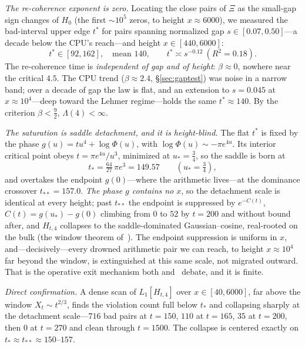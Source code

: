 \documentclass[11pt,reqno]{amsart}
\theoremstyle{plain}
\theoremstyle{definition}
\theoremstyle{remark}
\begin{document}
\emph{The re-coherence exponent is zero.} Locating the close pairs of
$\Xi$ as the small-gap sign changes of $H_0$ (the first $\sim\!10^5$ zeros,
to height $x\approx6000$), we measured the bad-interval upper edge
$t^\ast$ for pairs spanning normalized gap $s\in[0.07,0.50]$---a decade
below the CPU's reach---and height $x\in[440,6000]$:
\[
   t^\ast\in[92,162],\quad \text{mean }140,\qquad t^\ast\asymp
   s^{-0.12}\ (R^2=0.18).
\]
The re-coherence time is \emph{independent of gap and of height}:
$\beta\approx0$, nowhere near the critical $4.5$. The CPU trend
($\beta\approx2.4$, \S\ref{sec:gaptest}) was noise in a narrow band; over a
decade of gap the law is flat, and an extension to $s=0.045$ at $x\approx
10^4$---deep toward the Lehmer regime---holds the same $t^\ast\approx140$.
By the criterion $\beta<\tfrac92$, $\Lambda(4)<\infty$.

\emph{The saturation is saddle detachment, and it is height-blind.} The
flat $t^\ast$ is fixed by the phase $g(u)=tu^4+\log\Phi(u)$, with
$\log\Phi(u)\sim-\pi e^{4u}$. Its interior critical point obeys
$t=\pi e^{4u}/u^3$, minimized at $u_*=\tfrac34$, so the saddle is born at
\begin{equation}\label{eq:tstar4}
   t_*=\tfrac{64}{27}\,\pi e^{3}=149.57\qquad(u_*=\tfrac34),
\end{equation}
and overtakes the endpoint $g(0)$---where the arithmetic lives---at the
dominance crossover $t_{**}=157.0$. \emph{The phase $g$ contains no $x$},
so the detachment scale is identical at every height; past $t_{**}$ the
endpoint is suppressed by $e^{-C(t)}$, $C(t)=g(u_*)-g(0)$ climbing from $0$
to $52$ by $t=200$ and without bound after, and $H_{t,4}$ collapses to the
saddle-dominated Gaussian--cosine, real-rooted on the bulk (the window
theorem of~\cite{FontesIBM}). The endpoint suppression is uniform in $x$,
and---decisively---every drowned arithmetic pair we can reach, to height
$x\approx10^4$ far beyond the window, is extinguished at this same scale,
not migrated outward. That is the operative exit mechanism both
\cite{FontesIBM} and~\cite{FontesRMT} debate, and it is finite.

\emph{Direct confirmation.} A dense scan of $L_1[H_{t,4}]$ over
$x\in[40,6000]$, far above the window $X_t\sim t^{2/3}$, finds the
violation count full below $t_*$ and collapsing sharply at the detachment
scale---$716$ bad pairs at $t=150$, $110$ at $t=165$, $35$ at $t=200$, then
$0$ at $t=270$ and clean through $t=1500$. The collapse is centered exactly
on $t_*\approx t_{**}\approx150$--$157$.
\end{document}
